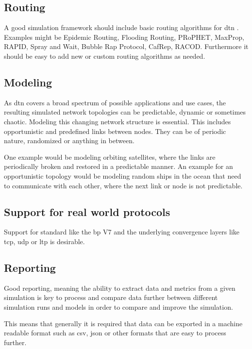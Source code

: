 \documentclass{tudscrartcl}
\newcommand{\dtn}{
  \ac{dtn}
}
\begin{document}
\subsection{Routing}

A good simulation framework should include basic routing algorithms for \dtn.
Examples might be Epidemic Routing, Flooding Routing, PRoPHET, MaxProp, RAPID, Spray and Wait, Bubble Rap Protocol, CafRep, RACOD. Furthermore it should be easy to add new or custom routing algorithms as needed.

\subsection{Modeling}

As \dtn covers a broad spectrum of possible applications and use cases, the resulting simulated network topologies can be predictable, dynamic or sometimes chaotic.
Modeling this changing network structure is essential. This includes opportunistic and predefined links between nodes. They can be of periodic nature, randomized or anything in between.

One example would be modeling orbiting satellites, where the links are periodically broken and restored in a predictable manner. An example for an opportunistic topology would be modeling random ships in the ocean that need to communicate with each other, where the next link or node is not predictable.

\subsection{Support for real world protocols}

Support for standard like the \ac{bp} V7 and the underlying convergence layers like \ac{tcp}, \ac{udp} or \ac{ltp} is desirable.

\subsection{Reporting}

Good reporting, meaning the ability to extract data and metrics from a given simulation is key to process and compare data further between different simulation runs and models in order to compare and improve the simulation.

This means that generally it is required that data can be exported in a machine readable format such as csv, json or other formats that are easy to process further.
\end{document}
